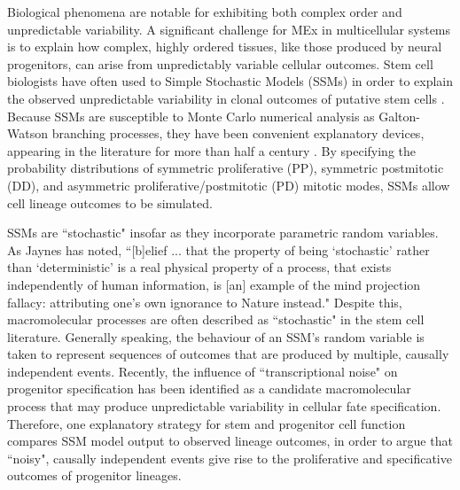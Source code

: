 \documentclass{ut-thesis}
\begin{document}
\begin{NoHyper}
Biological phenomena are notable for exhibiting both complex order and unpredictable variability. A significant challenge for MEx in multicellular systems is to explain how complex, highly ordered tissues, like those produced by neural progenitors, can arise from unpredictably variable cellular outcomes. Stem cell biologists have often used to Simple Stochastic Models (SSMs) in order to explain the observed unpredictable variability in clonal outcomes of putative stem cells \cite{Fagan2013}. Because SSMs are susceptible to Monte Carlo numerical analysis as Galton-Watson branching processes, they have been convenient explanatory devices, appearing in the literature for more than half a century \cite{Till1964}. By specifying the probability distributions of symmetric proliferative (PP), symmetric postmitotic (DD), and asymmetric proliferative/postmitotic (PD) mitotic modes, SSMs allow cell lineage outcomes to be simulated.

SSMs are ``stochastic" insofar as they incorporate parametric random variables. As Jaynes has noted, ``[b]elief ... that the property of being ‘stochastic' rather than ‘deterministic' is a real physical property of a process, that exists independently of human information, is [an] example of the mind projection fallacy: attributing one’s own ignorance to Nature instead." \cite[pp.506]{Jaynes2003} Despite this, macromolecular processes are often described as ``stochastic" in the stem cell literature. Generally speaking, the behaviour of an SSM's random variable is taken to represent sequences of outcomes that are produced by multiple, causally independent events. Recently, the influence of ``transcriptional noise" on progenitor specification has been identified as a candidate macromolecular process that may produce unpredictable variability in cellular fate specification. Therefore, one explanatory strategy for stem and progenitor cell function compares SSM model output to observed lineage outcomes, in order to argue that ``noisy", causally independent events give rise to the proliferative and specificative outcomes of progenitor lineages.


\end{NoHyper}
\end{document}
